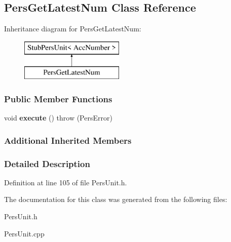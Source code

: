 \hypertarget{classPersGetLatestNum}{\subsection{Pers\-Get\-Latest\-Num Class Reference}
\label{df/dec/classPersGetLatestNum}
}
Inheritance diagram for Pers\-Get\-Latest\-Num\-:\begin{figure}[H]
\begin{center}
\leavevmode
\includegraphics[height=2.000000cm]{df/dec/classPersGetLatestNum}
\end{center}
\end{figure}
\subsubsection*{Public Member Functions}
\begin{DoxyCompactItemize}
\item 
\hypertarget{classPersGetLatestNum_adf7f74e302ac82728b168e28d973ea3e}{void {\bfseries execute} ()  throw (\-Pers\-Error)}\label{df/dec/classPersGetLatestNum_adf7f74e302ac82728b168e28d973ea3e}

\end{DoxyCompactItemize}
\subsubsection*{Additional Inherited Members}


\subsubsection{Detailed Description}


Definition at line 105 of file Pers\-Unit.\-h.



The documentation for this class was generated from the following files\-:\begin{DoxyCompactItemize}
\item 
Pers\-Unit.\-h\item 
Pers\-Unit.\-cpp\end{DoxyCompactItemize}
